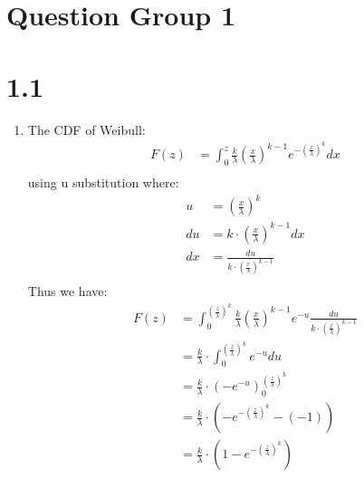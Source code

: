 \documentclass{article}
\title{\thetitle}
\author{\theauthor}
\begin{document}
\maketitle

\section*{Question Group 1}
\section*{1.1}
\begin{enumerate}
\item The CDF of Weibull: \\
\begin{align*}
F(z) &= \int_0^{z}\frac{k}{\lambda} (\frac{x}{\lambda})^{k-1}e^{-(\frac{x}{\lambda})^k} dx\\
\end{align*}
using u substitution where: 
\begin{align*}
u &= (\frac{x}{\lambda})^k \\
du &= k \cdot (\frac{x}{\lambda})^{k-1}dx \\
dx &= \frac{du}{k \cdot (\frac{x}{\lambda})^{k-1}} \\
\end{align*}
Thus we have: \\
\begin{align*}
F(z) &= \int_0^{(\frac{z}{\lambda})^k}\frac{k}{\lambda} (\frac{x}{\lambda})^{k-1}e^{-u}  \frac{du}{k \cdot (\frac{x}{\lambda})^{k-1}}\\
&= \frac{k}{\lambda} \cdot  \int_0^{ (\frac{z}{\lambda})^k} e^{-u} du \\
&= \frac{k}{\lambda} \cdot (-e^{-u})_0^{ (\frac{z}{\lambda})^k} \\
&= \frac{k}{\lambda} \cdot (-e^{-(\frac{z}{\lambda})^k} - (-1)) \\
&= \frac{k}{\lambda} \cdot (1 - e^{-(\frac{z}{\lambda})^k}) \\
\end{align*}
\end{enumerate}
\end{document}
